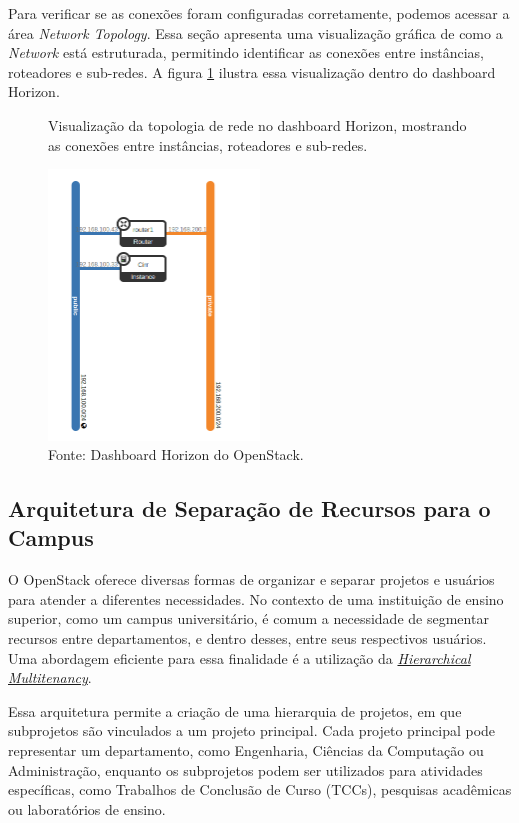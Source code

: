 Para verificar se as conexões foram configuradas corretamente, podemos acessar a área \textit{Network Topology}. Essa seção apresenta uma visualização gráfica de como a \textit{Network} está estruturada, permitindo identificar as conexões entre instâncias, roteadores e sub-redes. A figura \ref{fig:network_topology} ilustra essa visualização dentro do dashboard Horizon.

\begin{figure}[htbp]
    \centering
    \caption{Visualização da topologia de rede no dashboard Horizon, mostrando as conexões entre instâncias, roteadores e sub-redes.}
    \includegraphics[width=0.5\textwidth]{images/network_topology.png}
    \caption*{Fonte: Dashboard Horizon do OpenStack.}
    \label{fig:network_topology}
\end{figure}

\subsection{Arquitetura de Separação de Recursos para o Campus}

O OpenStack oferece diversas formas de organizar e separar projetos e usuários para atender a diferentes necessidades. No contexto de uma instituição de ensino superior, como um campus universitário, é comum a necessidade de segmentar recursos entre departamentos, e dentro desses, entre seus respectivos usuários. Uma abordagem eficiente para essa finalidade é a utilização da \href{https://wiki.openstack.org/wiki/HierarchicalMultitenancy}{\textit{Hierarchical Multitenancy}}.

Essa arquitetura permite a criação de uma hierarquia de projetos, em que subprojetos são vinculados a um projeto principal. Cada projeto principal pode representar um departamento, como Engenharia, Ciências da Computação ou Administração, enquanto os subprojetos podem ser utilizados para atividades específicas, como Trabalhos de Conclusão de Curso (TCCs), pesquisas acadêmicas ou laboratórios de ensino. 

